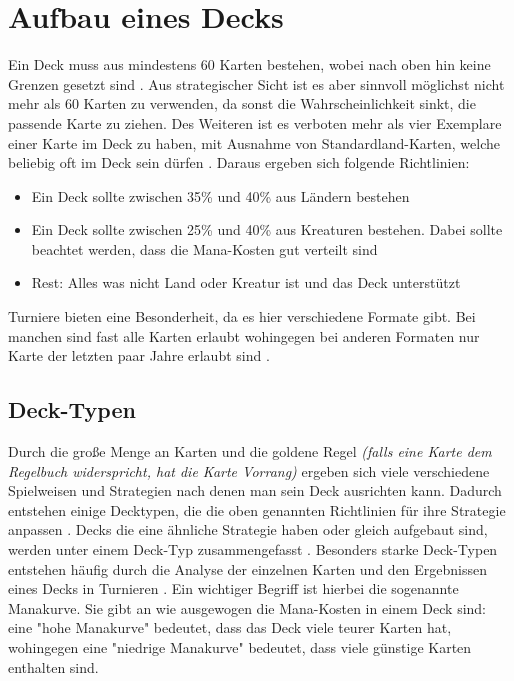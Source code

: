 \section{Aufbau eines Decks}\label{ch:grundlagen:deck}
Ein Deck muss aus mindestens 60 Karten bestehen, wobei nach oben hin keine Grenzen gesetzt sind \cite{rulebook:2013}. Aus strategischer Sicht ist es aber sinnvoll möglichst nicht mehr als 60 Karten zu verwenden, da sonst die Wahrscheinlichkeit sinkt, die passende Karte zu ziehen. Des Weiteren ist es verboten mehr als vier Exemplare einer Karte im Deck zu haben, mit Ausnahme von Standardland-Karten, welche beliebig oft im Deck sein dürfen \cite{rulebook:2013}. Daraus ergeben sich folgende Richtlinien: 
\begin{itemize}
    \item Ein Deck sollte zwischen 35\% und 40\% aus Ländern bestehen  \cite{wotc:gameplay}
    \item Ein Deck sollte zwischen 25\% und 40\% aus Kreaturen bestehen. Dabei sollte beachtet werden, dass die Mana-Kosten gut verteilt sind  \cite{wotc:gameplay}
    \item Rest: Alles was nicht Land oder Kreatur ist und das Deck unterstützt \cite{wotc:gameplay}
\end{itemize}
Turniere bieten eine Besonderheit, da es hier verschiedene Formate gibt. Bei manchen sind fast alle Karten erlaubt wohingegen bei anderen Formaten nur Karte der letzten paar Jahre erlaubt sind \cite{wotc:gameplay}.


\subsection{Deck-Typen}
Durch die große Menge an Karten und die goldene Regel \emph{(falls eine Karte dem Regelbuch widerspricht, hat die Karte Vorrang)} ergeben sich viele verschiedene Spielweisen und Strategien nach denen man sein Deck ausrichten kann. Dadurch entstehen einige Decktypen, die die oben genannten Richtlinien für ihre Strategie anpassen \cite{wotc:gameplay}. Decks die eine ähnliche Strategie haben oder gleich aufgebaut sind, werden unter einem Deck-Typ zusammengefasst \cite{haumagic}. Besonders starke Deck-Typen entstehen häufig durch die Analyse der einzelnen Karten und den Ergebnissen eines Decks in Turnieren \cite{haumagic}. Ein wichtiger Begriff ist hierbei die sogenannte Manakurve. Sie gibt an wie ausgewogen die Mana-Kosten in einem Deck sind: eine "hohe Manakurve" bedeutet, dass das Deck viele teurer Karten hat, wohingegen eine "niedrige Manakurve" bedeutet, dass viele günstige Karten enthalten sind. 

